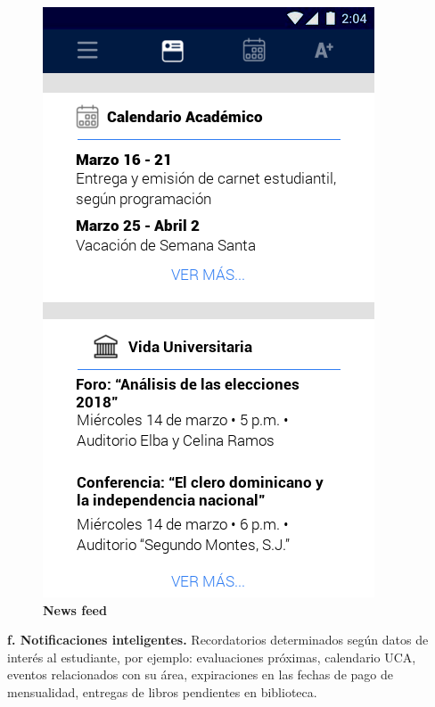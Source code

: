 \documentclass[12pt]{article}
\begin{document}
\begin{figure}[H]
	\caption{\textbf{News feed}}
	\label{fig:newsFeed}
	\includegraphics[scale=0.50]{img/3.png}
	\centering
\end{figure}


\textbf{f. Notificaciones inteligentes. }Recordatorios determinados seg\'un  datos de inter\'es al estudiante, por ejemplo: evaluaciones pr\'oximas, calendario UCA, eventos relacionados con su \'area, expiraciones en las fechas de pago de mensualidad, entregas de libros pendientes en biblioteca.\\
\end{document}
